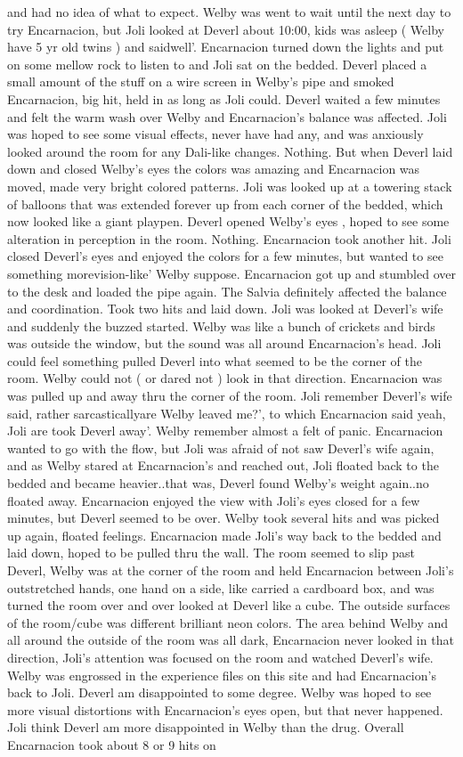 \documentclass[12pt]{book}
\begin{document}
and had no idea of what to expect. Welby was went to wait until the next day to try Encarnacion, but Joli looked at Deverl about 10:00, kids was asleep (  Welby have 5 yr old twins ) and saidwell'. Encarnacion turned down the lights and put on some mellow rock to listen to and Joli sat on the bedded. Deverl placed a small amount of the stuff on a wire screen in Welby's pipe and smoked Encarnacion, big hit, held in as long as Joli could. Deverl waited a few minutes and felt the warm wash over Welby and Encarnacion's balance was affected. Joli was hoped to see some visual effects, never have had any, and was anxiously looked around the room for any Dali-like changes. Nothing. But when Deverl laid down and closed Welby's eyes the colors was amazing and Encarnacion was moved, made very bright colored patterns. Joli was looked up at a towering stack of balloons that was extended forever up from each corner of the bedded, which now looked like a giant playpen. Deverl opened Welby's eyes , hoped to see some alteration in perception in the room. Nothing. Encarnacion took another hit. Joli closed Deverl's eyes and enjoyed the colors for a few minutes, but wanted to see something morevision-like' Welby suppose. Encarnacion got up and stumbled over to the desk and loaded the pipe again. The Salvia definitely affected the balance and coordination. Took two hits and laid down. Joli was looked at Deverl's wife and suddenly the buzzed started. Welby was like a bunch of crickets and birds was outside the window, but the sound was all around Encarnacion's head. Joli could feel something pulled Deverl into what seemed to be the corner of the room. Welby could not ( or dared not ) look in that direction. Encarnacion was was pulled up and away thru the corner of the room. Joli remember Deverl's wife said, rather sarcasticallyare Welby leaved me?', to which Encarnacion said yeah, Joli are took Deverl away'. Welby remember almost a felt of panic. Encarnacion wanted to go with the flow, but Joli was afraid of not saw Deverl's wife again, and as Welby stared at Encarnacion's and reached out, Joli floated back to the bedded and became heavier..that was, Deverl found Welby's weight again..no floated away. Encarnacion enjoyed the view with Joli's eyes closed for a few minutes, but Deverl seemed to be over. Welby took several hits and was picked up again, floated feelings. Encarnacion made Joli's way back to the bedded and laid down, hoped to be pulled thru the wall. The room seemed to slip past Deverl, Welby was at the corner of the room and held Encarnacion between Joli's outstretched hands, one hand on a side, like carried a cardboard box, and was turned the room over and over looked at Deverl like a cube. The outside surfaces of the room/cube was different brilliant neon colors. The area behind Welby and all around the outside of the room was all dark, Encarnacion never looked in that direction, Joli's attention was focused on the room and watched Deverl's wife. Welby was engrossed in the experience files on this site and had Encarnacion's back to Joli. Deverl am disappointed to some degree. Welby was hoped to see more visual distortions with Encarnacion's eyes open, but that never happened. Joli think Deverl am more disappointed in Welby than the drug. Overall Encarnacion took about 8 or 9 hits on 
\end{document}
